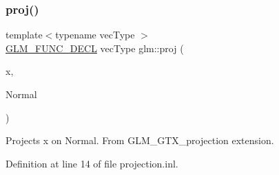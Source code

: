 \subsubsection{\texorpdfstring{proj()}{proj()}}
{\footnotesize\ttfamily template$<$typename vec\+Type $>$ \\
\hyperlink{setup_8hpp_ab2d052de21a70539923e9bcbf6e83a51}{G\+L\+M\+\_\+\+F\+U\+N\+C\+\_\+\+D\+E\+CL} vec\+Type glm\+::proj (\begin{DoxyParamCaption}\item[{vec\+Type const \&}]{x,  }\item[{vec\+Type const \&}]{Normal }\end{DoxyParamCaption})}

Projects x on Normal. From G\+L\+M\+\_\+\+G\+T\+X\+\_\+projection extension. 

Definition at line 14 of file projection.\+inl.

